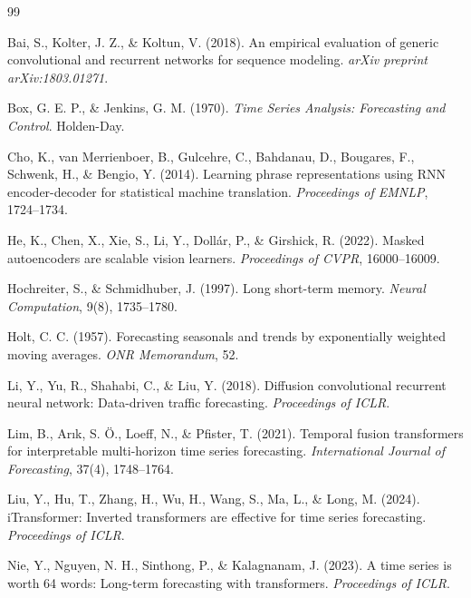 \documentclass[preprint,12pt,authoryear]{elsarticle}
\begin{document}
\begin{thebibliography}{99}

Bai, S., Kolter, J. Z., \& Koltun, V. (2018). An empirical evaluation of generic convolutional and recurrent networks for sequence modeling. \textit{arXiv preprint arXiv:1803.01271}.

Box, G. E. P., \& Jenkins, G. M. (1970). \textit{Time Series Analysis: Forecasting and Control}. Holden-Day.

Cho, K., van Merrienboer, B., Gulcehre, C., Bahdanau, D., Bougares, F., Schwenk, H., \& Bengio, Y. (2014). Learning phrase representations using RNN encoder-decoder for statistical machine translation. \textit{Proceedings of EMNLP}, 1724--1734.

He, K., Chen, X., Xie, S., Li, Y., Dollár, P., \& Girshick, R. (2022). Masked autoencoders are scalable vision learners. \textit{Proceedings of CVPR}, 16000--16009.

Hochreiter, S., \& Schmidhuber, J. (1997). Long short-term memory. \textit{Neural Computation}, 9(8), 1735--1780.

Holt, C. C. (1957). Forecasting seasonals and trends by exponentially weighted moving averages. \textit{ONR Memorandum}, 52.

Li, Y., Yu, R., Shahabi, C., \& Liu, Y. (2018). Diffusion convolutional recurrent neural network: Data-driven traffic forecasting. \textit{Proceedings of ICLR}.

Lim, B., Arık, S. Ö., Loeff, N., \& Pfister, T. (2021). Temporal fusion transformers for interpretable multi-horizon time series forecasting. \textit{International Journal of Forecasting}, 37(4), 1748--1764.

Liu, Y., Hu, T., Zhang, H., Wu, H., Wang, S., Ma, L., \& Long, M. (2024). iTransformer: Inverted transformers are effective for time series forecasting. \textit{Proceedings of ICLR}.

Nie, Y., Nguyen, N. H., Sinthong, P., \& Kalagnanam, J. (2023). A time series is worth 64 words: Long-term forecasting with transformers. \textit{Proceedings of ICLR}.


\end{thebibliography}
\end{document}
